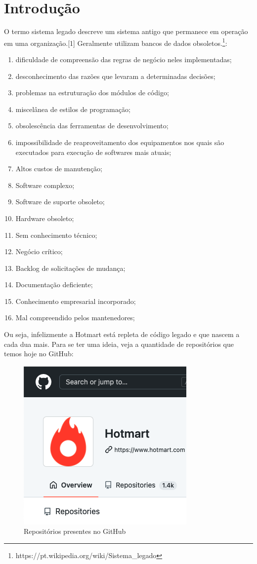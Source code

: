 \section{Introdução}
O termo sistema legado descreve um sistema antigo que permanece em operação em uma organização.[1] Geralmente utilizam bancos de dados obsoletos.\footnote{https://pt.wikipedia.org/wiki/Sistema\_legado}:
\begin{enumerate}
    \item dificuldade de compreensão das regras de negócio neles implementadas;
    \item desconhecimento das razões que levaram a determinadas decisões;
    \item problemas na estruturação dos módulos de código;
    \item miscelânea de estilos de programação;
    \item obsolescência das ferramentas de desenvolvimento;
    \item impossibilidade de reaproveitamento dos equipamentos nos quais são executados para execução de softwares mais atuais;
    \item Altos custos de manutenção;
    \item Software complexo;
    \item Software de suporte obsoleto;
    \item Hardware obsoleto;
    \item Sem conhecimento técnico;
    \item Negócio crítico;
    \item Backlog de solicitações de mudança;
    \item Documentação deficiente;
    \item Conhecimento empresarial incorporado;
    \item Mal compreendido pelos mantenedores;
\end{enumerate}

Ou seja, infelizmente a Hotmart está repleta de código legado e que nascem a cada dua mais. Para se ter uma ideia, veja a quantidade de repositórios que temos hoje no GitHub:

\begin{figure}[H]
    \centering
    \includegraphics[scale=1,keepaspectratio=true]{images/01.png}
    \caption{Repositórios presentes no GitHub}
    \label{github_repo}
\end{figure}

